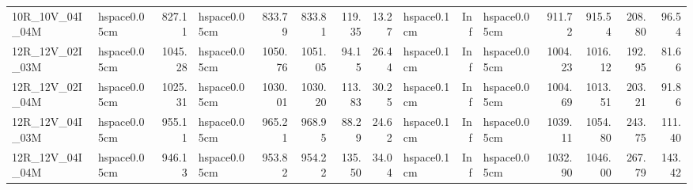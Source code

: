 \begin{tabular}{llrlrrrrlrlrrrr}
10R_10V_04I_04M & hspace{0.05cm} & 827.11 & hspace{0.05cm} & 833.79 & 833.81 & 119.35 & 13.27 & hspace{0.1cm} & Inf & hspace{0.05cm} & 911.72 & 915.54 & 208.80 & 96.54\\
\addlinespace
12R_12V_02I_03M & hspace{0.05cm} & 1045.28 & hspace{0.05cm} & 1050.76 & 1051.05 & 94.15 & 26.44 & hspace{0.1cm} & Inf & hspace{0.05cm} & 1004.23 & 1016.12 & 192.95 & 81.66\\
12R_12V_02I_04M & hspace{0.05cm} & 1025.31 & hspace{0.05cm} & 1030.01 & 1030.20 & 113.83 & 30.25 & hspace{0.1cm} & Inf & hspace{0.05cm} & 1004.69 & 1013.51 & 203.21 & 91.86\\
12R_12V_04I_03M & hspace{0.05cm} & 955.11 & hspace{0.05cm} & 965.21 & 968.95 & 88.29 & 24.62 & hspace{0.1cm} & Inf & hspace{0.05cm} & 1039.11 & 1054.80 & 243.75 & 111.40\\
12R_12V_04I_04M & hspace{0.05cm} & 946.13 & hspace{0.05cm} & 953.82 & 954.22 & 135.50 & 34.04 & hspace{0.1cm} & Inf & hspace{0.05cm} & 1032.90 & 1046.00 & 267.79 & 143.42\\
\bottomrule
\end{tabular}
